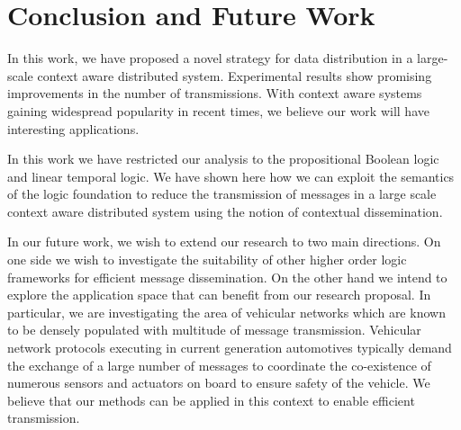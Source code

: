 \chapter{Conclusion and Future Work} \label{chap9}
\noindent
In this work, we have proposed a novel strategy for data distribution in a large-scale 
context aware distributed system. Experimental results show promising improvements in the 
number of transmissions. With context aware systems gaining widespread popularity in 
recent times, we believe our work will have interesting applications.

\noindent
In this work we have restricted our analysis to the propositional Boolean logic and linear temporal logic. 
We have shown here how we can exploit the semantics of the logic foundation to reduce the transmission 
of messages in a large scale context aware distributed system using the notion of contextual dissemination.

\noindent
In our future work, we wish to extend our research to two main directions. 
On one side we wish to investigate the suitability of other higher order logic frameworks for efficient message dissemination.
On the other hand we intend to explore the application space that can benefit from our research proposal. In particular, 
we are investigating the area of vehicular networks which are 
known to be densely populated with multitude of message transmission. 
Vehicular network protocols executing in current generation automotives
typically demand the exchange of a large number of messages to coordinate the 
co-existence of numerous sensors and actuators on board to ensure safety of the vehicle. We believe that our methods
can be applied in this context to enable efficient transmission. 



\begin{comment}
while most of the common systems around us can be efficiently modeled
using linear temporal logic and its derivativ

We have proposed the context rule modeling using propositional logic and then we extend our framework into
linear temporal logic. We experiment our framework in random environment using propositional logic. 
Our future work includes the following:
\begin{description}
 \item Experiment our framework using linear temporal logic.
 \item Compare our work with existing works in terms of energy or bandwidth.
 \item Extend our work into higher order logic families.
 \item Make our system fault tolerant and more robust. 
\end{description}


\end{comment}